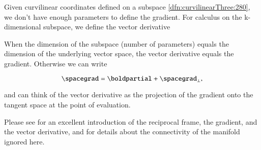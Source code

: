 %
%

Given curvilinear coordinates defined on a subspace \cref{dfn:curvilinearThree:280}, we don't have enough parameters to define the gradient.  For calculus on the k-dimensional subspace, we define the vector derivative


When the dimension of the subspace (number of parameters) equals the dimension of the underlying vector space, the vector derivative equals the gradient.  Otherwise we can write

\begin{dmath}\label{eqn:vectorDerivative:101}
\spacegrad = \boldpartial + \spacegrad_\perp,
\end{dmath}

and can think of the vector derivative as the projection of the gradient onto the tangent space at the point of evaluation.

Please see \citep{aMacdonaldVAGC} for an excellent introduction of the reciprocal frame, the gradient, and the vector derivative, and for
details about the connectivity of the manifold ignored here.

